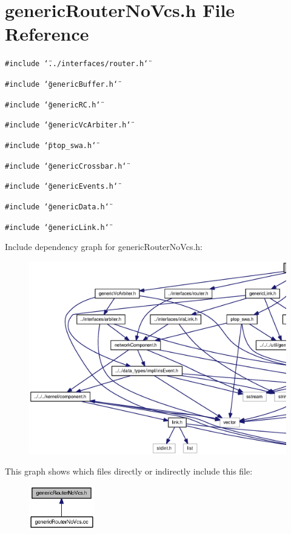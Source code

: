 \section{genericRouterNoVcs.h File Reference}
\label{genericRouterNoVcs_8h}
{\tt \#include \char`\"{}../interfaces/router.h\char`\"{}}\par
{\tt \#include \char`\"{}genericBuffer.h\char`\"{}}\par
{\tt \#include \char`\"{}genericRC.h\char`\"{}}\par
{\tt \#include \char`\"{}genericVcArbiter.h\char`\"{}}\par
{\tt \#include \char`\"{}ptop\_\-swa.h\char`\"{}}\par
{\tt \#include \char`\"{}genericCrossbar.h\char`\"{}}\par
{\tt \#include \char`\"{}genericEvents.h\char`\"{}}\par
{\tt \#include \char`\"{}genericData.h\char`\"{}}\par
{\tt \#include \char`\"{}genericLink.h\char`\"{}}\par


Include dependency graph for genericRouterNoVcs.h:\nopagebreak
\begin{figure}[H]
\begin{center}
\leavevmode
\includegraphics[width=420pt]{genericRouterNoVcs_8h__incl}
\end{center}
\end{figure}


This graph shows which files directly or indirectly include this file:\nopagebreak
\begin{figure}[H]
\begin{center}
\leavevmode
\includegraphics[width=81pt]{genericRouterNoVcs_8h__dep__incl}
\end{center}
\end{figure}
